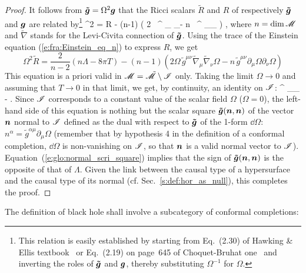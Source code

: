 \begin{proof}
It follows from $\bm{\tilde{g}} = \Omega^2 \bm{g}$ that the Ricci scalars $\tilde{R}$
and $R$ of respectively $\bm{\tilde{g}}$ and $\bm{g}$ are related by\footnote{This relation is
easily established by starting from Eq.~(2.30) of Hawking \& Ellis textbook~\cite{HawkiE73} or Eq.~(2.19) on page~645 of Choquet-Bruhat one~\cite{Choqu09} and inverting the roles of $\bm{\tilde{g}}$ and $\bm{g}$, thereby substituting
$\Omega^{-1}$ for $\Omega$.}
\be \label{e:glo:tildeR_R}
    \Omega^2  = R - (n-1) \left( 2 \Omega \, ^{\mu\nu} \tilde{\nabla}_\mu
    \tilde{\nabla}_\nu \Omega - n \, ^{\mu\nu} \partial_\mu \Omega \partial_\nu \Omega
    \right) ,
\ee
where $n = \mathrm{dim}\, \mathscr{M}$ and $\tilde{\nabla}$ stands for the Levi-Civita connection of
$\bm{\tilde{g}}$. Using the trace of the Einstein equation (\ref{e:fra:Einstein_eq_n}) to
express $R$, we get
\[
    \Omega^2 \tilde{R} = \frac{2}{n-2}\left( n \Lambda - 8\pi T \right)
     - (n-1) \left( 2 \Omega \, \tilde{g}^{\mu\nu} \tilde{\nabla}_\mu
    \tilde{\nabla}_\nu \Omega - n \, \tilde{g}^{\mu\nu} \partial_\mu \Omega \partial_\nu \Omega
    \right)
\]
This equation is a priori valid in $\mathscr{M} = \tilde{\mathscr{M}}\setminus\mathscr{I}$ only.
Taking the limit $\Omega\rightarrow 0$ and
assuming that $T\rightarrow 0$ in that limit, we get, by continuity, an identity
on $\mathscr{I}$:
\be \label{e:glo:normal_scri_square}
^{\mu\nu} \partial_\mu \Omega \partial_\nu \Omega \stackrel{\scri}{=}
    -  \Lambda .
\ee
Since $\mathscr{I}$ corresponds to a constant value of the scalar field $\Omega$ ($\Omega=0$),
the left-hand side of this equation is nothing but the scalar square
$\bm{\tilde{g}}(\bm{n},\bm{n})$ of the vector $\bm{n}$ normal to $\mathscr{I}$
defined as the dual with respect to $\bm{\tilde{g}}$ of the 1-form
$\dd\Omega$: $n^\alpha = \tilde{g}^{\alpha\mu} \partial_\mu \Omega$
(remember that by hypothesis 4 in the definition
of a conformal completion, $\dd\Omega$ is non-vanishing on $\mathscr{I}$, so that
$\bm{n}$  is a valid normal
vector to $\mathscr{I}$). Equation~(\ref{e:glo:normal_scri_square}) implies
that the sign of $\bm{\tilde{g}}(\bm{n},\bm{n})$ is the opposite of that of $\Lambda$.
Given the link between the causal type of a hypersurface and the causal type of its normal
(cf. Sec.~\ref{s:def:hor_as_null}), this completes the proof.
\end{proof}

The definition of black hole shall involve a subcategory of conformal completions:

